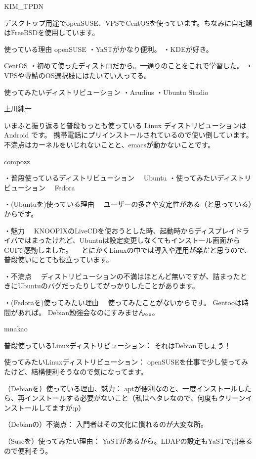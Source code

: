 \begin{prework}{ KIM\_TPDN }

デスクトップ用途でopenSUSE、VPSでCentOSを使っています。ちなみに自宅鯖はFreeBSDを使用しています。

使っている理由
openSUSE
・YaSTがかなり便利。
・KDEが好き。

CentOS
・初めて使ったディストロだから。一通りのことをこれで学習した。
・VPSや専鯖のOS選択肢にはたいてい入ってる。

使ってみたいディストリビューション
・Arudius
・Ubuntu Studio



\end{prework}



\begin{prework}{ 上川純一 }

いまふと振り返ると普段もっとも使っている Linux ディストリビューションは Android です。
携帯電話にプリインストールされているので使い倒しています。
不満点はカーネルをいじれないことと、emacsが動かないことです。


\end{prework}



\begin{prework}{ compozz }

・普段使っているディストリビューション
　Ubuntu
・使ってみたいディストリビューション
　Fedora

・(Ubuntuを)使っている理由
　ユーザーの多さや安定性がある（と思っている）からです。

・魅力
　KNOOPIXのLiveCDを使おうとした時、起動時からディスプレイドライバではまったけれど、Ubuntuは設定変更しなくてもインストール画面からGUIで感動しました。
　とにかくLinuxの中では導入や運用が楽だと思うので、普段使いにとても役立っています。

・不満点
　ディストリビューションの不満はほとんど無いですが、詰まったときにUbuntuのバグだったりしてがっかりしたことがあります。

・(Fedoraを)使ってみたい理由
　使ってみたことがないからです。 Gentooは時間があれば。
Debian勉強会なのにすみません。。。

\end{prework}



\begin{prework}{ mnakao }

普段使っているLinuxディストリビューション：
それはDebianでしょう！

使ってみたいLinuxディストリビューション：
openSUSEを仕事で少し使ってみたけど、結構便利そうなので気になってます。

（Debianを）使っている理由、魅力：
aptが便利なのと、一度インストールしたら、再インストールする必要がないこと（私はヘタレなので、何度もクリーンインストールしてますが:p）

（Debianの）不満点：
入門者はその文化に慣れるのが大変な所。

（Suseを）使ってみたい理由：
YaSTがあるから。LDAPの設定もYaSTで出来るので便利そう。


\end{prework}



